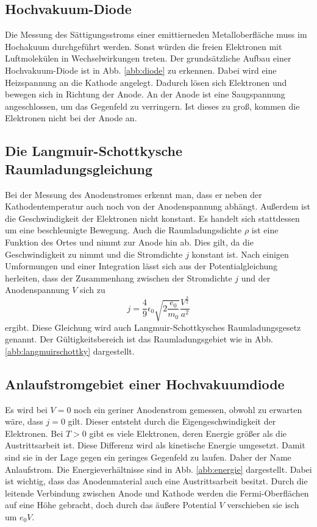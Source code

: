 \subsection{Hochvakuum-Diode}

Die Messung des Sättigungsstroms einer emittierneden Metalloberfläche muss im Hochakuum durchgeführt werden. Sonst würden die freien Elektronen mit Luftmolekülen in Wechselwirkungen treten. Der grundsätzliche Aufbau einer Hochvakuum-Diode ist in Abb. \ref{abb:diode} zu erkennen. 
Dabei wird eine Heizspannung an die Kathode angelegt. Dadurch lösen sich Elektronen und bewegen sich in Richtung der Anode. An der Anode ist eine Saugspannung angeschlossen, um das Gegenfeld zu verringern. Ist dieses zu groß, kommen die Elektronen nicht bei der Anode an. 

\subsection{Die Langmuir-Schottkysche Raumladungsgleichung}

Bei der Messung des Anodenstromes erkennt man, dass er neben der Kathodentemperatur auch noch von der Anodenspannung abhängt. Außerdem ist die Geschwindigkeit der Elektronen nicht konstant. Es handelt sich stattdessen um eine beschleunigte Bewegung. Auch die Raumladungsdichte $\rho$ ist eine Funktion des Ortes und nimmt zur Anode hin ab. Dies gilt, da die Geschwindigkeit zu nimmt und die Stromdichte $j$ konstant ist. Nach einigen Umformungen und einer Integration lässt sich aus der Potentialgleichung herleiten, dass der Zusammenhang zwischen der Stromdichte $j$ und der Anodenspannung $V$ sich zu 
\begin{equation}
    j = \frac{4}{9} \epsilon_0 \sqrt{2 \frac{e_0}{m_0}} \frac{V^{\frac{3}{2}}}{a^2}
    \label{eqn:langmuirschottky}
\end{equation}
ergibt. Diese Gleichung wird auch Langmuir-Schottkysches Raumladungsgesetz genannt. Der Gültigkeitsbereich ist das Raumladungsgebiet wie in Abb. \ref{abb:langmuirschottky} dargestellt.  

\subsection{Anlaufstromgebiet einer Hochvakuumdiode}

Es wird bei $V = 0$ noch ein geriner Anodenstrom gemessen, obwohl zu erwarten wäre, dass $j = 0$ gilt. Dieser entsteht durch die Eigengeschwindigkeit der Elektronen. Bei $T > 0$ gibt es viele Elektronen, deren Energie größer als die Austrittsarbeit ist. Diese Differenz wird als kinetische Energie umgesetzt. Damit sind sie in der Lage gegen ein geringes Gegenfeld zu laufen. Daher der Name Anlaufstrom. Die Energieverhältnisse sind in Abb. \ref{abb:energie} dargestellt. Dabei ist wichtig, dass das Anodenmaterial auch eine Austrittsarbeit besitzt. Durch die leitende Verbindung zwischen Anode und Kathode werden die Fermi-Oberflächen auf eine Höhe gebracht, doch durch das äußere Potential $V$ verschieben sie isch um $e_0 V$. 

